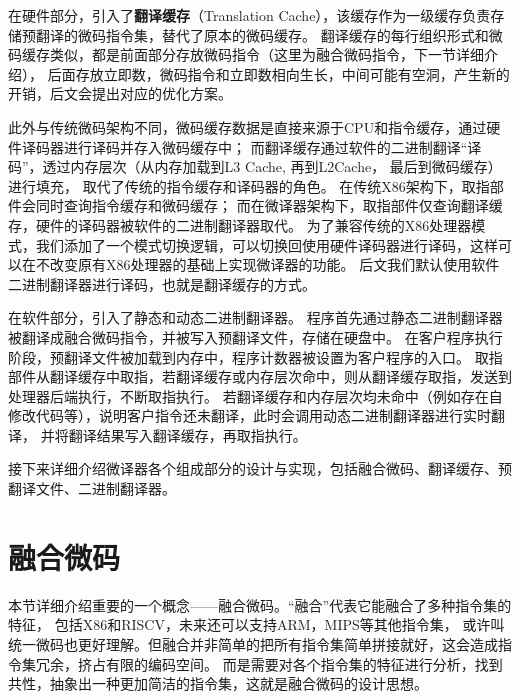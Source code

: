 
在硬件部分，引入了\textbf{翻译缓存}（Translation Cache），该缓存作为一级缓存负责存储预翻译的微码指令集，替代了原本的微码缓存。
翻译缓存的每行组织形式和微码缓存类似，都是前面部分存放微码指令（这里为融合微码指令，下一节详细介绍），
后面存放立即数，微码指令和立即数相向生长，中间可能有空洞，产生新的开销，后文会提出对应的优化方案。

此外与传统微码架构不同，微码缓存数据是直接来源于CPU和指令缓存，通过硬件译码器进行译码并存入微码缓存中；
而翻译缓存通过软件的二进制翻译“译码”，透过内存层次（从内存加载到L3 Cache, 再到L2Cache， 最后到微码缓存）进行填充，
取代了传统的指令缓存和译码器的角色。
在传统X86架构下，取指部件会同时查询指令缓存和微码缓存；
而在微译器架构下，取指部件仅查询翻译缓存，硬件的译码器被软件的二进制翻译器取代。
为了兼容传统的X86处理器模式，我们添加了一个模式切换逻辑，可以切换回使用硬件译码器进行译码，这样可以在不改变原有X86处理器的基础上实现微译器的功能。
后文我们默认使用软件二进制翻译器进行译码，也就是翻译缓存的方式。


在软件部分，引入了静态和动态二进制翻译器。
程序首先通过静态二进制翻译器被翻译成融合微码指令，并被写入预翻译文件，存储在硬盘中。
在客户程序执行阶段，预翻译文件被加载到内存中，程序计数器被设置为客户程序的入口。
取指部件从翻译缓存中取指，若翻译缓存或内存层次命中，则从翻译缓存取指，发送到处理器后端执行，不断取指执行。
若翻译缓存和内存层次均未命中（例如存在自修改代码等），说明客户指令还未翻译，此时会调用动态二进制翻译器进行实时翻译，
并将翻译结果写入翻译缓存，再取指执行。

接下来详细介绍微译器各个组成部分的设计与实现，包括融合微码、翻译缓存、预翻译文件、二进制翻译器。

\section{融合微码}
本节详细介绍重要的一个概念——融合微码。“融合”代表它能融合了多种指令集的特征，
包括X86和RISCV，未来还可以支持ARM，MIPS等其他指令集，
或许叫统一微码也更好理解。但融合并非简单的把所有指令集简单拼接就好，这会造成指令集冗余，挤占有限的编码空间。
而是需要对各个指令集的特征进行分析，找到共性，抽象出一种更加简洁的指令集，这就是融合微码的设计思想。

